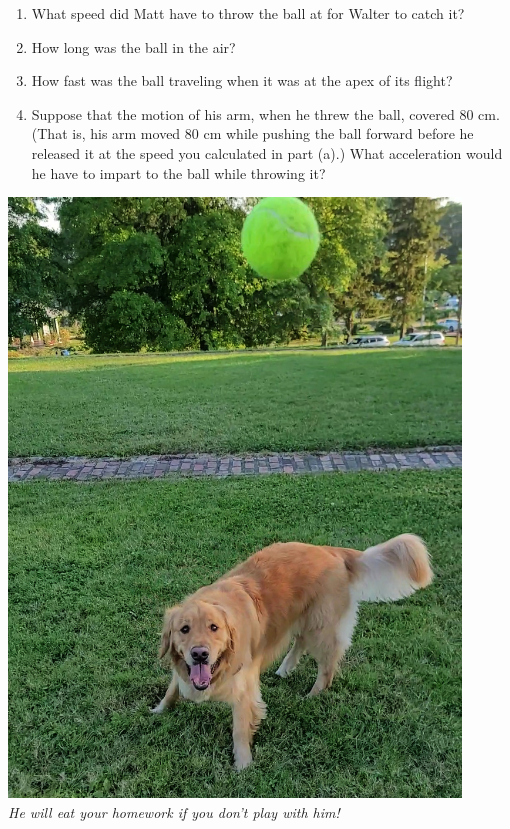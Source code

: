 \documentclass[12pt]{article}
\begin{document}
\begin{enumerate}
\begin{minipage}{0.55\textwidth}
\begin{enumerate}
	\item What speed did Matt have to throw the ball at for Walter to catch it?
	\item How long was the ball in the air?
	\item How fast was the ball traveling when it was at the apex of its flight?
	\item Suppose that the motion of his arm, when he threw the ball, covered 80 cm. (That is, his arm moved 80 cm while pushing the ball forward before he released it at the speed you calculated in part (a).) What acceleration would he have to impart to the ball while throwing it?
\end{enumerate}
\end{minipage}
		\begin{minipage}{0.45\textwidth}
	\begin{center}
		\includegraphics[width=0.9\textwidth]{walter.jpg}\\
		\scriptsize \it 
		He will eat your homework if you don't play with him!
	\end{center}
\end{minipage}


\end{enumerate}
\end{document}
